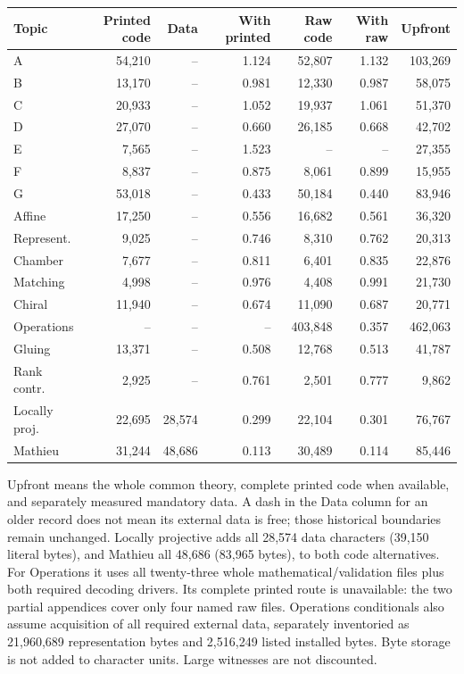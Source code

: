 \documentclass[11pt,a4paper]{article}
\newcommand{\tabsetup}{\small\setlength{\tabcolsep}{4pt}\renewcommand{\arraystretch}{1.10}}
\begin{document}
\begin{center}\tabsetup\begin{tabular}{lrrrrrr}\toprule
Topic & Printed code & Data & With printed & Raw code & With raw & Upfront\\\midrule
A & 54,210 & -- & 1.124 & 52,807 & 1.132 & 103,269 \\
B & 13,170 & -- & 0.981 & 12,330 & 0.987 & 58,075 \\
C & 20,933 & -- & 1.052 & 19,937 & 1.061 & 51,370 \\
D & 27,070 & -- & 0.660 & 26,185 & 0.668 & 42,702 \\
E & 7,565 & -- & 1.523 & -- & -- & 27,355 \\
F & 8,837 & -- & 0.875 & 8,061 & 0.899 & 15,955 \\
G & 53,018 & -- & 0.433 & 50,184 & 0.440 & 83,946 \\
Affine & 17,250 & -- & 0.556 & 16,682 & 0.561 & 36,320 \\
Represent. & 9,025 & -- & 0.746 & 8,310 & 0.762 & 20,313 \\
Chamber & 7,677 & -- & 0.811 & 6,401 & 0.835 & 22,876 \\
Matching & 4,998 & -- & 0.976 & 4,408 & 0.991 & 21,730 \\
Chiral & 11,940 & -- & 0.674 & 11,090 & 0.687 & 20,771 \\
Operations & -- & -- & -- & 403,848 & 0.357 & 462,063 \\
Gluing & 13,371 & -- & 0.508 & 12,768 & 0.513 & 41,787 \\
Rank contr. & 2,925 & -- & 0.761 & 2,501 & 0.777 & 9,862 \\
Locally proj. & 22,695 & 28,574 & 0.299 & 22,104 & 0.301 & 76,767 \\
Mathieu & 31,244 & 48,686 & 0.113 & 30,489 & 0.114 & 85,446 \\
\bottomrule\end{tabular}\end{center}
Upfront means the whole common theory, complete printed code when available, and separately measured mandatory data. A dash in the Data column for an older record does not mean its external data is free; those historical boundaries remain unchanged. Locally projective adds all 28,574 data characters (39,150 literal bytes), and Mathieu all 48,686 (83,965 bytes), to both code alternatives. For Operations it uses all twenty-three whole mathematical/validation files plus both required decoding drivers. Its complete printed route is unavailable: the two partial appendices cover only four named raw files. Operations conditionals also assume acquisition of all required external data, separately inventoried as 21,960,689 representation bytes and 2,516,249 listed installed bytes. Byte storage is not added to character units. Large witnesses are not discounted.
\end{document}
